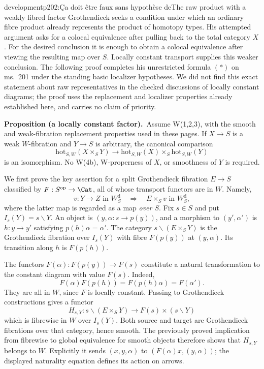 \begin{dcomment}{development}{p202:Ça doit être faux sans hypothèse de}{The raw product with a weakly fibred factor}
Grothendieck seeks a condition under which an ordinary fibre product already represents the product of homotopy types. His attempted argument asks for a colocal equivalence after pulling back to the total category $X$. For the desired conclusion it is enough to obtain a colocal equivalence after viewing the resulting map over $S$. Locally constant transport supplies this weaker conclusion. The following proof completes his unrestricted formula $(*)$ on ms.~201 under the standing basic localizer hypotheses. We did not find this exact statement about raw representatives in the checked discussions of locally constant diagrams; the proof uses the replacement and localizer properties already established here, and carries no claim of priority.

\textbf{Proposition (a locally constant factor).}\ours\
Assume W(1,2,3), with the smooth and weak-fibration replacement properties used in these pages. If $X\to S$ is a weak $W$-fibration and $Y\to S$ is arbitrary, the canonical comparison
\[
\mathrm{hot}_{S,W}(X\times_S Y)
\longrightarrow
\mathrm{hot}_{S,W}(X)\times_S\mathrm{hot}_{S,W}(Y)
\]
is an isomorphism. No W(4b), W-properness of $X$, or smoothness of $Y$ is required.

We first prove the key assertion for a split Grothendieck fibration $E\to S$ classified by $F:S^{\mathrm{op}}\to\Cat$, all of whose transport functors are in $W$. Namely,
\[
v:Y\to Z\text{ in }W_S^{\mathrm d}
\quad\Longrightarrow\quad
E\times_S v\text{ in }W_S^{\mathrm d},
\]
where the latter map is regarded as a map \emph{over $S$}. Fix $s\in S$ and put $I_s(Y)=s\backslash Y$. An object is $(y,\alpha:s\to p(y))$, and a morphism to $(y',\alpha')$ is $h:y\to y'$ satisfying $p(h)\alpha=\alpha'$. The category $s\backslash(E\times_S Y)$ is the Grothendieck fibration over $I_s(Y)$ with fibre $F(p(y))$ at $(y,\alpha)$. Its transition along $h$ is $F(p(h))$.

The functors $F(\alpha):F(p(y))\to F(s)$ constitute a natural transformation to the constant diagram with value $F(s)$. Indeed,
\[
F(\alpha)F(p(h))=F(p(h)\alpha)=F(\alpha').
\]
They are all in $W$, since $F$ is locally constant. Passing to Grothendieck constructions gives a functor
\[
H_{s,Y}:s\backslash(E\times_S Y)
\longrightarrow F(s)\times(s\backslash Y)
\]
which is fibrewise in $W$ over $I_s(Y)$. Both source and target are Grothendieck fibrations over that category, hence smooth. The previously proved implication from fibrewise to global equivalence for smooth objects therefore shows that $H_{s,Y}$ belongs to $W$. Explicitly it sends $(x,y,\alpha)$ to $(F(\alpha)x,(y,\alpha))$; the displayed naturality equation defines its action on arrows.


\end{dcomment}
